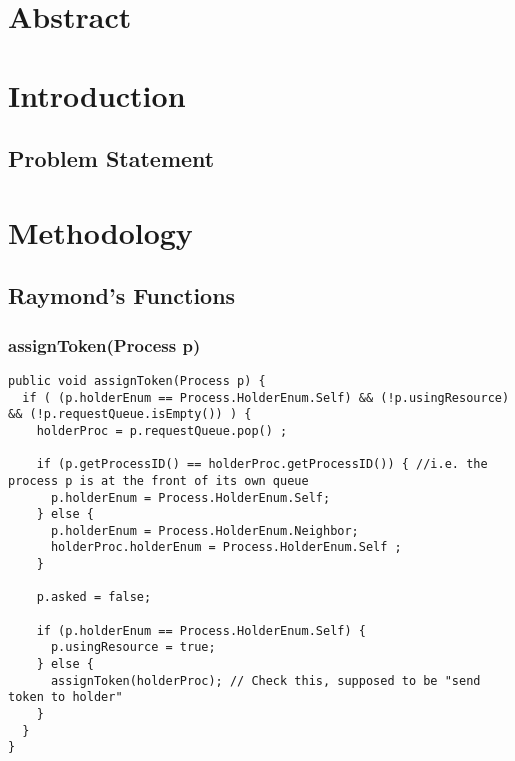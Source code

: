 \documentclass{article}
\begin{document}
\tableofcontents
\newpage
\maketitle
\begin{multicols}{2}
\section{Abstract}
\label{sec:Abstract}
\textit{}
\section{Introduction}
\label{sec:Introduction}
\lipsum[1]
	\subsection{Problem Statement}
	\label{subsec:ProblemStatement}
	\lipsum[2]

\section{Methodology}
\label{sec:Methodology}
\lipsum[1]
	\subsection{Raymond's Functions}
	\label{subsec:RaymondsFunctions}
	\lipsum[2]
		\subsubsection{assignToken(Process p)}
		\begin{lstlisting}
public void assignToken(Process p) {
  if ( (p.holderEnum == Process.HolderEnum.Self) && (!p.usingResource) && (!p.requestQueue.isEmpty()) ) {
    holderProc = p.requestQueue.pop() ;

    if (p.getProcessID() == holderProc.getProcessID()) { //i.e. the process p is at the front of its own queue
      p.holderEnum = Process.HolderEnum.Self;
    } else {
      p.holderEnum = Process.HolderEnum.Neighbor;
      holderProc.holderEnum = Process.HolderEnum.Self ;
    }
	
    p.asked = false;
	
    if (p.holderEnum == Process.HolderEnum.Self) {
      p.usingResource = true;
    } else {
      assignToken(holderProc); // Check this, supposed to be "send token to holder"
    }
  }
}
		\end{lstlisting}
		

\end{multicols}
\end{document}
